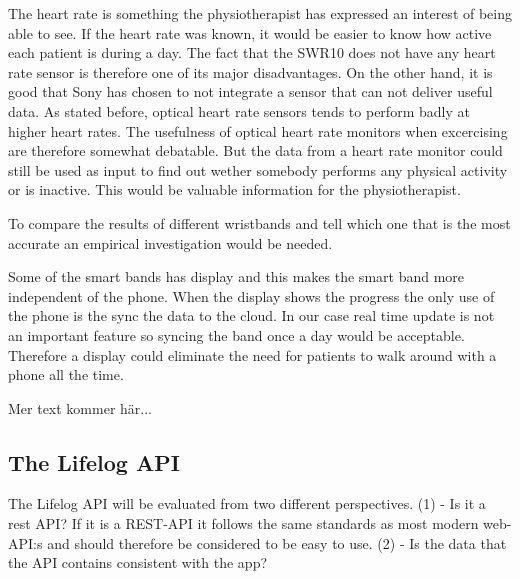 \documentclass{cslthse-msc}
\begin{document}
The heart rate is something the physiotherapist has expressed an interest of being able to see. If the heart rate was known, it would be easier to know how active each patient is during a day. The fact that the SWR10 does not have any heart rate sensor is therefore one of its major disadvantages. On the other hand, it is good that Sony has chosen to not integrate a sensor that can not deliver useful data. As stated before, optical heart rate sensors tends to perform badly at higher heart rates. The usefulness of optical heart rate monitors when excercising are therefore somewhat debatable. But the data from a heart rate monitor could still be used as input to find out wether somebody performs any physical activity or is inactive. This would be valuable information for the physiotherapist.



To compare the results of different wristbands and tell which one that is the most accurate an empirical investigation would be needed.  


Some of the smart bands has display and this makes the smart band more independent of the phone. When the display shows the progress the only use of the phone is the sync the data to the cloud. In our case real time update is not an important feature so syncing the band once a day would be acceptable. Therefore a display could eliminate the need for patients to walk around with a phone all the time.


Mer text kommer här...

\subsection{The Lifelog API}

The Lifelog API will be evaluated from two different perspectives. (1) - Is it a rest API? If it is a REST-API it follows the same standards as most modern web-API:s and should therefore be considered to be easy to use. (2) - Is the data that the API contains consistent with the app? 

\end{document}

